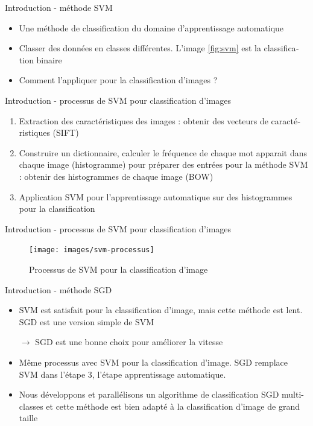 \documentclass[11pt]{beamer}
\begin{document}
\begin{otherlanguage}{french}
\begin{frame}{Introduction - méthode SVM}
\begin{itemize}
\item Une méthode de classification du domaine d'apprentissage automatique
\item Classer des données en classes différentes. L'image \ref{fig:svm} est la classification binaire 
\item Comment l'appliquer pour la classification d'images ?
\end{itemize}
\end{frame}

\begin{frame}{Introduction - processus de SVM pour classification d'images}
\begin{enumerate}
\item Extraction des caractéristiques des images : obtenir des vecteurs de caractéristiques (SIFT)
\item Construire un dictionnaire, calculer le fréquence de chaque mot apparait dans chaque image (histogramme) pour préparer des entrées pour la méthode SVM : obtenir des histogrammes de chaque image (BOW)
\item Application SVM pour l'apprentissage automatique sur des histogrammes pour la classification
\end{enumerate}
\end{frame}


\begin{frame}{Introduction - processus de SVM pour classification d'images}
\begin{figure}[ht!]
\centering
\texttt{[image: images/svm-processus]}
\caption{Processus de SVM pour la classification d'image}
\vspace{-2.0em}
\label{overflow}
\end{figure}
\end{frame}

\begin{frame}{Introduction - méthode SGD}
\begin{itemize}
\item SVM est satisfait pour la classification d'image, mais cette méthode est lent. SGD est une version simple de SVM

$\rightarrow$ SGD est une bonne choix pour améliorer la vitesse
\item Même processus avec SVM pour la classification d'image. SGD remplace SVM dans l'étape 3, l'étape apprentissage automatique.
\item Nous développons et parallélisons un algorithme de classification SGD multi-classes et cette méthode est bien adapté à la classification d'image de grand taille
\end{itemize}
\end{frame}



\end{otherlanguage}
\end{document}
